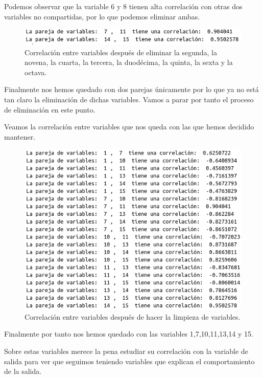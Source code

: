 \documentclass[12pt,a4paper]{article}
\begin{document}
Podemos observar que la variable 6 y 8 tienen alta correlación con otras dos variables no compartidas, por lo que podemos eliminar ambas.

\begin{figure}[H]
	\centering
	\includegraphics[scale=0.6]{./Imagenes/correlacion_entre_variables7.png}
	\caption{Correlación entre variables después de eliminar la segunda, la novena, la cuarta, la tercera, la duodécima, la quinta, la sexta y la octava.}
\end{figure}

Finalmente nos hemos quedado con dos parejas únicamente por lo que ya no está tan claro la  eliminación de dichas variables. Vamos a parar por tanto el proceso de eliminación en este punto.

Veamos la correlación entre variables que nos queda con las que hemos decidido mantener.

\begin{figure}[H]
	\centering
	\includegraphics[scale=0.6]{./Imagenes/correlacion_entre_variables8.png}
	\caption{Correlación entre variables después de hacer la limpieza de variables.}
\end{figure}

Finalmente por tanto nos hemos quedado con las variables 1,7,10,11,13,14 y 15.

Sobre estas variables merece la pena estudiar su correlación con la variable de salida para ver que seguimos teniendo variables que explican el comportamiento de la salida.
\end{document}
